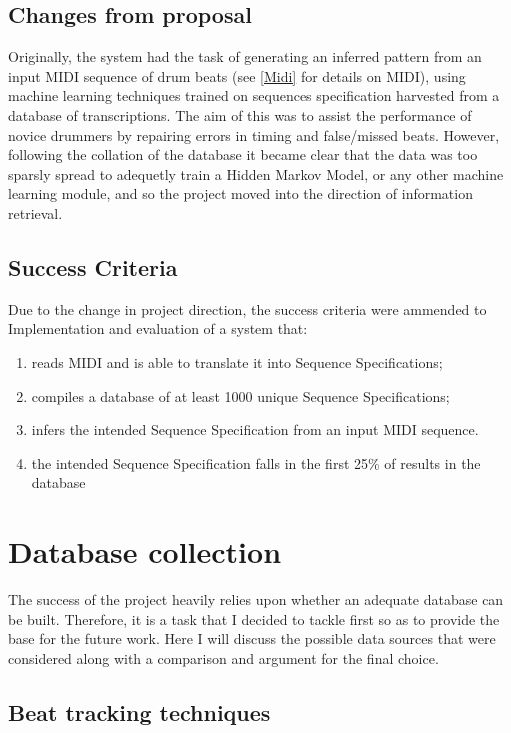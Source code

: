 \documentclass[12pt,twoside,notitlepage]{report}
\begin{document}
		\subsection{Changes from proposal}
		Originally, the system had the task of generating an inferred pattern from an input MIDI sequence of drum beats (see \ref{Midi} for details on MIDI), using machine learning techniques trained on sequences specification harvested from a database of transcriptions. The aim of this was to assist the performance of novice drummers by repairing errors in timing and false/missed beats. However, following the collation of the database it became clear that the data was too sparsly spread to adequetly train a Hidden Markov Model, or any other machine learning module, and so the project moved into the direction of information retrieval.
		
		\subsection{Success Criteria}\label{subsec:Success Criteria}
		Due to the change in project direction, the success criteria were ammended to Implementation and evaluation of a system that:
		\begin{enumerate}
			\item{reads MIDI and is able to translate it into Sequence Specifications;}
			\item{compiles a database of at least 1000 unique Sequence Specifications;}
			\item{infers the intended Sequence Specification from an input MIDI sequence.}
			\item{the intended Sequence Specification falls in the first 25\% of results in the database}  
		\end{enumerate}
		
		
	
	\section{Database collection}
	
	The success of the project heavily relies upon whether an adequate database can be built. Therefore, it is a task that I decided to tackle first so as to provide the base for the future work. Here I will discuss the possible data sources that were considered along with a comparison and argument for the final choice.
	
		\subsection{Beat tracking techniques}
		
\end{document}
